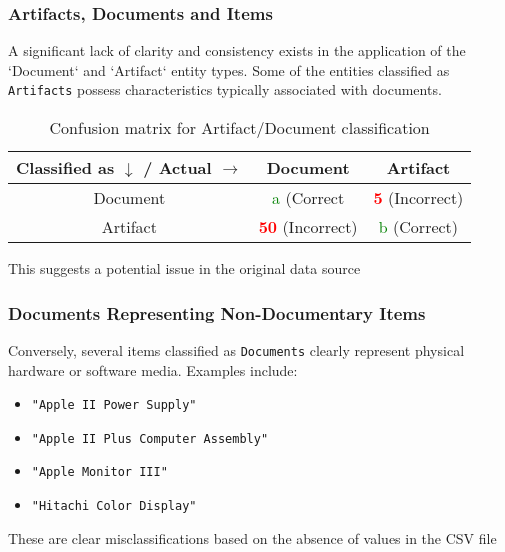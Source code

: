 \subsubsection{Artifacts, Documents and Items}
A significant lack of clarity and consistency exists in the application of the `Document` and `Artifact` entity types.
\newline
Some of the entities classified as \texttt{Artifacts} possess characteristics typically associated with documents.

\begin{table}[h]
    \centering
    \begin{tabular}{|c|c|c|}
        \hline
        Classified as $\downarrow$ / Actual $\rightarrow$ & Document & Artifact \\
        \hline
        Document & \textcolor{green}{a} (Correct & \textcolor{red}{\textbf{5}} (Incorrect) \\
        \hline
        Artifact & \textcolor{red}{\textbf{50}} (Incorrect) & \textcolor{green}{b}  (Correct) \\
        \hline
    \end{tabular}
    \caption{Confusion matrix for Artifact/Document classification}
    \label{tab:artifact_doc}
\end{table}

This suggests a potential issue in the original data source

\subsubsection{Documents Representing Non-Documentary Items}
Conversely, several items classified as \texttt{Documents} clearly represent physical hardware or software media. Examples include:
\begin{itemize}
    \item \texttt{"Apple II Power Supply"}
    \item \texttt{"Apple II Plus Computer Assembly"}
    \item \texttt{"Apple Monitor III"}
    \item \texttt{"Hitachi Color Display"}
\end{itemize}
These are clear misclassifications based on the absence of values in the CSV file


